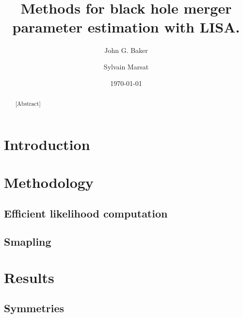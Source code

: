 \documentclass[aps,showpacs,twocolumn,prd,superscriptaddress,nofootinbib]{revtex4}
\begin{document}
\title{Methods for black hole merger parameter estimation with LISA.}

\author{John G. Baker}
\author{Sylvain Marsat}



\date{\today}

\begin{abstract}

[Abstract]

\end{abstract}


\maketitle


\section{Introduction}
\label{sec:intro}

\section{Methodology}
\subsection{Efficient likelihood computation}
\subsection{Smapling}
\section{Results}


\subsection{Symmetries}
\end{document}
